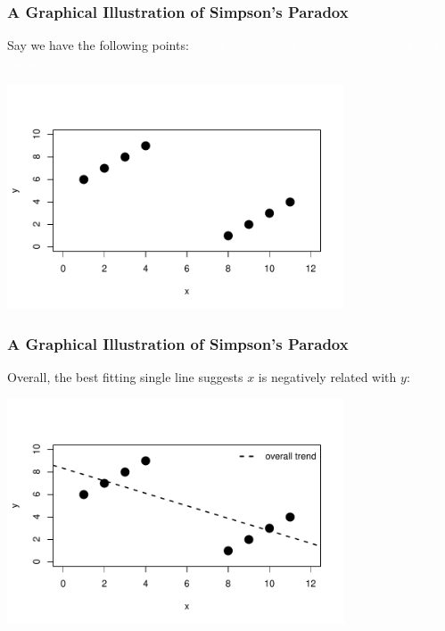 \documentclass[handout]{beamer}
\newcommand{\blue}[1]{\textcolor{blue2}{#1}}
\begin{document}
\begin{frame}
\frametitle{A Graphical Illustration of Simpson's Paradox}
Say we have the following points: \textcolor{white}{lorem ipsum lorem ipsum lorem ipsum lorem ipsum}
\begin{center}
\includegraphics[width=10cm]{figure/simpsons1.pdf}
\end{center}

\end{frame}



\begin{frame}
\frametitle{A Graphical Illustration of Simpson's Paradox}
Overall, the best fitting single line suggests $x$ is \blue{negatively} related with $y$:
\begin{center}
\includegraphics[width=10cm]{figure/simpsons2.pdf}
\end{center}

\end{frame}
\end{document}
